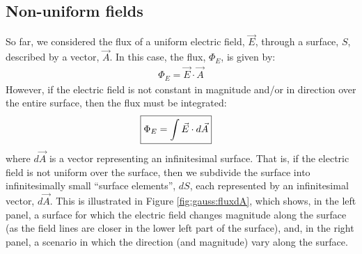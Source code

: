 \subsection{Non-uniform fields}
So far, we considered the flux of a uniform electric field, $\vec E$, through a surface, $S$, described by a vector, $\vec A$. In this case, the flux, $\Phi_E$, is given by:
\begin{align*}
\Phi_E=\vec E\cdot \vec A
\end{align*}
However, if the electric field is not constant in magnitude and/or in direction over the entire surface, then the flux must be integrated:
\begin{align*}
\Aboxed{\Phi_E=\int \vec E\cdot d\vec A}
\end{align*}
where $d\vec A$ is a vector representing an infinitesimal surface. That is, if the electric field is not uniform over the surface, then we subdivide the surface into infinitesimally small ``surface elements'', $dS$, each represented by an infinitesimal vector, $d\vec A$. This is illustrated in Figure \ref{fig:gauss:fluxdA}, which shows, in the left panel, a surface for which the electric field changes magnitude along the surface (as the field lines are closer in the lower left part of the surface), and, in the right panel, a scenario in which the direction (and magnitude) vary along the surface.

